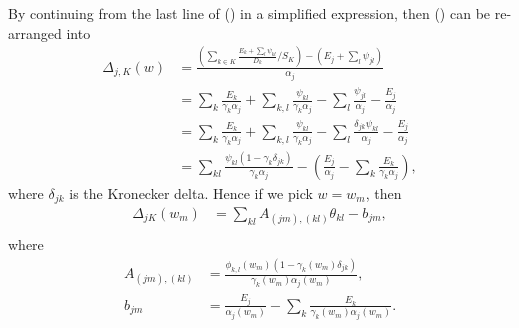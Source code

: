 \documentclass[12pt]{article}
\def\D{\displaystyle}
\begin{document}
By continuing from the last line of () in a simplified expression, then () can be re-arranged into
\begin{equation}
    \label{eq:delta_split}
    \begin{split}
        \Delta_{j,K}(w)&= \frac{\D \left(\sum_{k\in K} \frac{E_k + \sum_l \psi_{kl}}{D_k} / S_K\right) - \left(E_j + \sum_l \psi_{jl}\right)}{\alpha_j} \\
        &= \sum_k \frac{E_k}{\gamma_k\alpha_j} + \sum_{k,l} \frac{\psi_{kl}}{\gamma_k\alpha_j} - \sum_{l} \frac{\psi_{jl}}{\alpha_j} - \frac{E_j}{\alpha_j}\\
        &= \sum_k \frac{E_k}{\gamma_k\alpha_j} + \sum_{k,l} \frac{\psi_{kl}}{\gamma_k\alpha_j} - \sum_{l} \frac{\delta_{jk}\psi_{kl}}{\alpha_j} - \frac{E_j}{\alpha_j}\\
        &= \sum_{kl} \frac{\psi_{kl} (1-\gamma_k\delta_{jk})}{\gamma_k\alpha_j} - \left(\frac{E_j}{\alpha_j} - \sum_k\frac{E_k}{\gamma_k\alpha_j}\right),
    \end{split}
\end{equation}
where $\delta_{jk}$ is the Kronecker delta. Hence if we pick $w = w_m$, then
\begin{equation}
	\begin{split}
		\Delta_{jK}(w_m) &= \sum_{kl} A_{(jm), (kl)} \theta_{kl} - b_{jm}, \\
	\end{split}	
\end{equation}
where
\begin{equation}
	\begin{split}
		A_{(jm), (kl)} &= \frac{\phi_{k,l}(w_m)(1 - \gamma_k(w_m) \delta_{jk})}{\gamma_k(w_m) \alpha_j(w_m)},\\
		b_{jm} &= \frac{E_j}{\alpha_j(w_m)} - \sum_k\frac{E_k}{\gamma_k(w_m)  \alpha_j(w_m)}.
	\end{split}
\end{equation}
\end{document}
